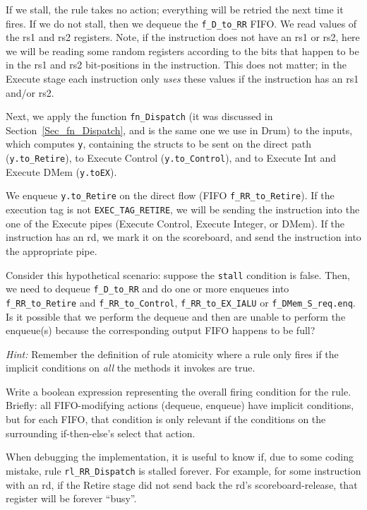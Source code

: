If we stall, the rule takes no action; everything will be retried the
next time it fires.  If we do not stall, then we dequeue the
\verb|f_D_to_RR| FIFO.  We read values of the rs1 and rs2 registers.
Note, if the instruction does not have an rs1 or rs2, here we will be
reading some random registers according to the bits that happen to be
in the rs1 and rs2 bit-positions in the instruction.  This does not
matter; in the Execute stage each instruction only \emph{uses} these
values if the instruction has an rs1 and/or rs2.

Next, we apply the function \verb|fn_Dispatch| (it was discussed in
Section~\ref{Sec_fn_Dispatch}, and is the same one we use in Drum) to
the inputs, which computes \verb|y|, containing the structs to be sent
on the direct path (\verb|y.to_Retire|), to Execute Control
(\verb|y.to_Control|), and to Execute Int and Execute DMem
(\verb|y.toEX|).

We enqueue \verb|y.to_Retire| on the direct flow (FIFO
\verb|f_RR_to_Retire|).  If the execution tag is not
\verb|EXEC_TAG_RETIRE|, we will be sending the instruction into the
one of the Execute pipes (Execute Control, Execute Integer, or DMem).
If the instruction has an rd, we mark it on the scoreboard, and send
the instruction into the appropriate pipe.

\hdivider

\Exercise

Consider this hypothetical scenario: suppose the \verb|stall|
condition is false.  Then, we need to dequeue \verb|f_D_to_RR| and do
one or more enqueues into \verb|f_RR_to_Retire| and
\verb|f_RR_to_Control|, \verb|f_RR_to_EX_IALU| or
\verb|f_DMem_S_req.enq|.  Is it possible that we perform the dequeue
and then are unable to perform the enqueue(s) because the
corresponding output FIFO happens to be full?

\emph{Hint:} Remember the definition of rule atomicity where a rule
only fires if the implicit conditions on \emph{all} the methods it
invokes are true.

\Exercise

Write a boolean expression representing the overall firing condition
for the rule.  Briefly: all FIFO-modifying actions (dequeue, enqueue)
have implicit conditions, but for each FIFO, that condition is only
relevant if the conditions on the surrounding if-then-else's select
that action.

\Exercise

When debugging the implementation, it is useful to know if, due to
some coding mistake, rule \verb|rl_RR_Dispatch| is stalled forever.
For example, for some instruction with an rd, if the Retire stage did
not send back the rd's scoreboard-release, that register will be
forever ``busy''.


